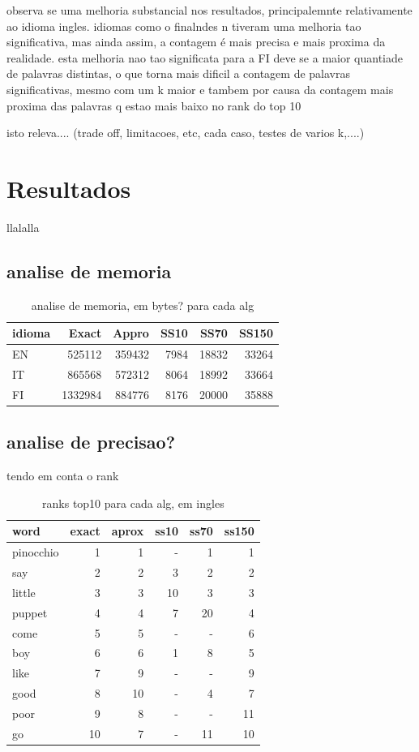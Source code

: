 \documentclass[mirror, portugues]{revdetua}
\begin{document}
observa se uma melhoria substancial nos resultados, principalemnte relativamente ao idioma ingles. idiomas como o finalndes n tiveram uma melhoria tao significativa, mas ainda assim, a contagem é mais precisa e mais proxima da realidade. esta melhoria nao tao significata para a FI deve se a maior quantiade de palavras distintas, o que torna mais dificil a contagem de palavras significativas, mesmo com um k maior e tambem por causa da contagem mais proxima das palavras q estao mais baixo no rank do top 10

isto releva.... (trade off, limitacoes, etc, cada caso, testes de varios k,....)


\section{Resultados}

llalalla

\subsection{analise de memoria}

\begin{table}[H]
\centering
\caption{analise de memoria, em bytes? para cada alg}
\label{table:memoria}
\begin{tabular}{lrrrrr}
\toprule
idioma & Exact & Appro & SS10 & SS70 & SS150 \\
\midrule
EN & 525112 & 359432 & 7984 & 18832 & 33264 \\
IT & 865568 & 572312 & 8064 & 18992 & 33664 \\
FI &1332984 & 884776 & 8176 & 20000 & 35888 \\
\bottomrule
\end{tabular}
\end{table}

\subsection{analise de precisao?}

tendo em conta o rank

\begin{table}[H]
\centering
\caption{ranks top10 para cada alg, em ingles}
\label{table:rank10_ing}
\begin{tabular}{lrrrrr}
\toprule
word & exact & aprox & ss10 & ss70 & ss150 \\
\midrule
pinocchio & 1 & 1 & - & 1 & 1 \\
say & 2 & 2 & 3 & 2 & 2 \\
little & 3 & 3 & 10 & 3 & 3 \\
puppet & 4 & 4 & 7 & 20 & 4 \\
come & 5 & 5 & - & - & 6 \\
boy & 6 & 6 & 1 & 8 & 5 \\
like & 7 & 9 & - & - & 9 \\
good & 8 & 10 & - & 4 & 7 \\
poor & 9 & 8 & - & - & 11 \\
go & 10 & 7 & - & 11 & 10 \\
\bottomrule
\end{tabular}
\end{table}
\end{document}
